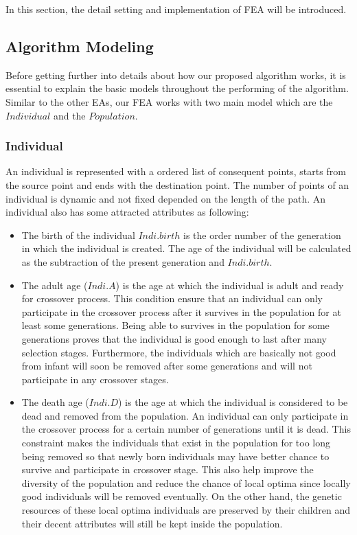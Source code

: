 \documentclass[final]{elsarticle}
\begin{document}
In this section, the detail setting and implementation of FEA will be introduced.

\subsection{Algorithm Modeling}

Before getting further into details about how our proposed algorithm works, it is essential to explain the basic models throughout the performing of the algorithm. Similar to the other EAs, our FEA works with two main model which are the $ Individual $ and the $ Population $.

\subsubsection{Individual}

An individual is represented with a ordered list of consequent points, starts from the source point and ends with the destination point. The number of points of an individual is dynamic and not fixed depended on the length of the path. An individual also has some attracted attributes as following: \\
\begin{itemize}
	\item The birth of the individual $Indi.birth$ is the order number of the generation in which the individual is created. The age of the individual will be calculated as the subtraction of the present generation and $Indi.birth$.
	\item The adult age ($Indi.A$) is the age at which the individual is adult and ready for crossover process. This condition ensure that an individual can only participate in the crossover process after it survives in the population for at least some generations. Being able to survives in the population for some generations proves that the individual is good enough to last after many selection stages. Furthermore, the individuals which are basically not good from infant will soon be removed after some generations and will not participate in any crossover stages.
	\item The death age ($Indi.D$) is the age at which the individual is considered to be dead and removed from the population. An individual can only participate in the crossover process for a certain number of generations until it is dead. This constraint makes the individuals that exist in the population for too long being removed so that newly born individuals may have better chance to survive and participate in crossover stage. This also help improve the diversity of the population and reduce the chance of local optima since locally good individuals will be removed eventually. On the other hand, the genetic resources of these local optima individuals are preserved by their children and their decent attributes will still be kept inside the population.
\end{itemize}
\end{document}
